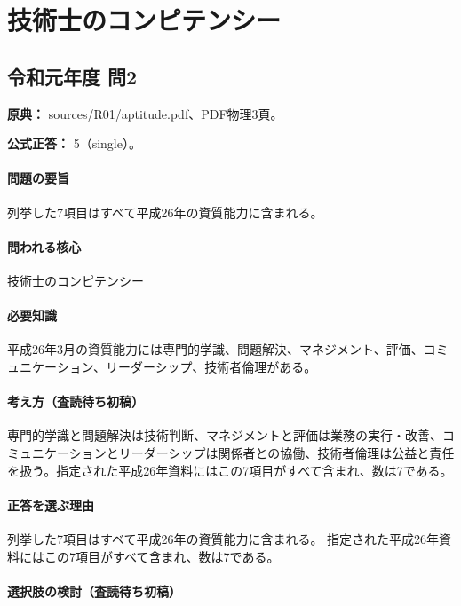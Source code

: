 \section{技術士のコンピテンシー}

\subsection{令和元年度 問2}
\label{q:r01-reg-apt-02}

\noindent\textbf{原典：} sources/R01/aptitude.pdf、PDF物理3頁。

\textbf{公式正答：} 5（single）。

\paragraph{問題の要旨} 列挙した7項目はすべて平成26年の資質能力に含まれる。

\paragraph{問われる核心} 技術士のコンピテンシー

\paragraph{必要知識} 平成26年3月の資質能力には専門的学識、問題解決、マネジメント、評価、コミュニケーション、リーダーシップ、技術者倫理がある。

\paragraph{考え方（査読待ち初稿）} 専門的学識と問題解決は技術判断、マネジメントと評価は業務の実行・改善、コミュニケーションとリーダーシップは関係者との協働、技術者倫理は公益と責任を扱う。指定された平成26年資料にはこの7項目がすべて含まれ、数は7である。

\paragraph{正答を選ぶ理由} 列挙した7項目はすべて平成26年の資質能力に含まれる。 指定された平成26年資料にはこの7項目がすべて含まれ、数は7である。

\paragraph{選択肢の検討（査読待ち初稿）}\mbox{}\par

